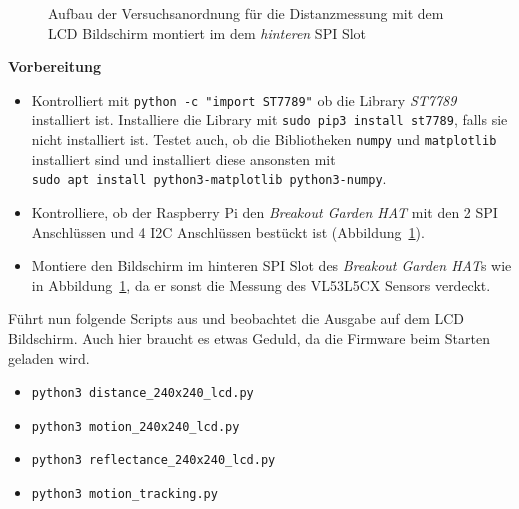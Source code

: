 \documentclass[
  11pt,
  a4paper,
  oneside, openany  ,captions=tableheading
]{scrbook}
\providecommand{\tightlist}{%
  \setlength{\itemsep}{0pt}\setlength{\parskip}{0pt}}
\theoremstyle{remark}
\begin{document}
\begin{figure}


\caption{\label{fig-vl53l5cx-LCD}Aufbau der Versuchsanordnung für die
Distanzmessung mit dem LCD Bildschirm montiert im dem \emph{hinteren}
SPI Slot}

\end{figure}%

\textbf{Vorbereitung}

\begin{itemize}
\tightlist
\item
  Kontrolliert mit \texttt{python\ -c\ "import\ ST7789"} ob die Library
  \emph{ST7789} installiert ist. Installiere die Library mit
  \texttt{sudo\ pip3\ install\ st7789}, falls sie nicht installiert ist.
  Testet auch, ob die Bibliotheken \texttt{numpy} und
  \texttt{matplotlib} installiert sind und installiert diese ansonsten
  mit \texttt{sudo\ apt\ install\ python3-matplotlib\ python3-numpy}.
\item
  Kontrolliere, ob der Raspberry Pi den \emph{Breakout Garden HAT} mit
  den 2 SPI Anschlüssen und 4 I2C Anschlüssen bestückt ist
  (Abbildung~\ref{fig-vl53l5cx-LCD}).
\item
  Montiere den Bildschirm im hinteren SPI Slot des \emph{Breakout Garden
  HAT}s wie in Abbildung~\ref{fig-vl53l5cx-LCD}, da er sonst die Messung
  des VL53L5CX Sensors verdeckt.
\end{itemize}

Führt nun folgende Scripts aus und beobachtet die Ausgabe auf dem LCD
Bildschirm. Auch hier braucht es etwas Geduld, da die Firmware beim
Starten geladen wird.

\begin{itemize}
\tightlist
\item
  \texttt{python3\ distance\_240x240\_lcd.py}
\item
  \texttt{python3\ motion\_240x240\_lcd.py}
\item
  \texttt{python3\ reflectance\_240x240\_lcd.py}
\item
  \texttt{python3\ motion\_tracking.py}
\end{itemize}
\end{document}
